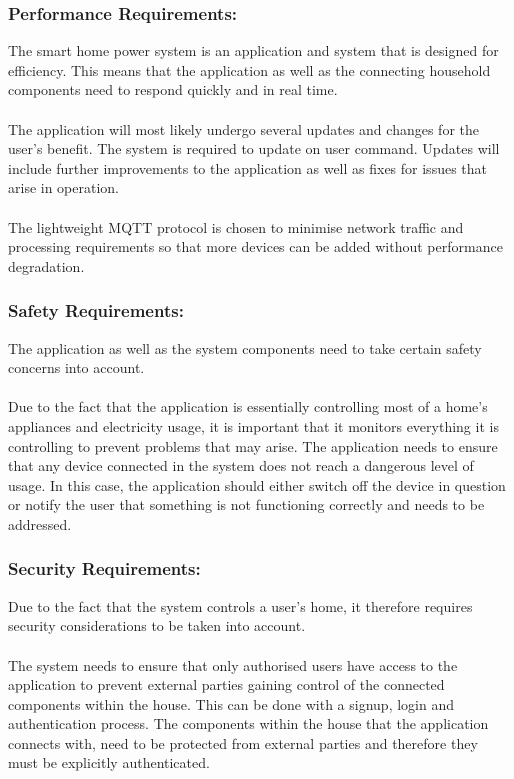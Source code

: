 \documentclass[10pt,twocolumn]{witseiepaper}
\begin{document}
	\subsubsection{Performance Requirements:}
	The smart home power system is an application and system that is designed for efficiency. This means that the application as well as the connecting household components need to respond quickly and in real time. 
	\\\\
	The application will most likely undergo several updates and changes for the user's benefit. The system is required to update on user command. Updates will include further improvements to the application as well as fixes for issues that arise in operation.
	\\\\
	The lightweight MQTT protocol is chosen to minimise network traffic and processing requirements so that more devices can be added without performance degradation. 
	
	\subsubsection{Safety Requirements:} 
	The application as well as the system components need to take certain safety concerns into account. 
	\\\\
	Due to the fact that the application is essentially controlling most of a home's appliances and electricity usage, it is important that it monitors everything it is controlling to prevent problems that may arise. The application needs to ensure that any device connected in the system does not reach a dangerous level of usage. In this case, the application should either switch off the device in question or notify the user that something is not functioning correctly and needs to be addressed. 
	
	\subsubsection{Security Requirements:}
	Due to the fact that the system controls a user's home, it therefore requires security considerations to be taken into account.
	\\\\
	The system needs to ensure that only authorised users have access to the application to prevent external parties gaining control of the connected components within the house. This can be done with a signup, login and authentication process. 
	The components within the house that the application connects with, need to be protected from external parties and therefore they must be explicitly authenticated. 
	
\end{document}
